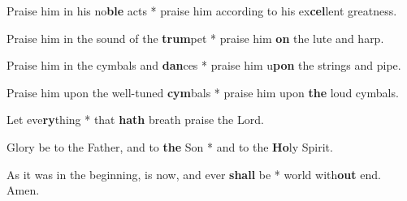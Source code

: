 \begin{multicols}{2}
	Praise him in his no\textbf{ble} acts * praise him according to his ex\textbf{cel}lent greatness.
	
	Praise him in the sound of the \textbf{trum}pet * praise him \textbf{on} the lute and harp.
	
	Praise him in the cymbals and \textbf{dan}ces * praise him u\textbf{pon} the strings and pipe.
	
	Praise him upon the well-tuned \textbf{cym}bals * praise him upon \textbf{the} loud cymbals.
	
	Let eve\textbf{ry}thing * that \textbf{hath} breath praise the Lord.
	
	Glory be to the Father, and to \textbf{the} Son * and to the \textbf{Ho}ly Spirit.
	
	As it was in the beginning, is now, and ever \textbf{shall} be * world with\textbf{out} end. Amen.
\end{multicols}